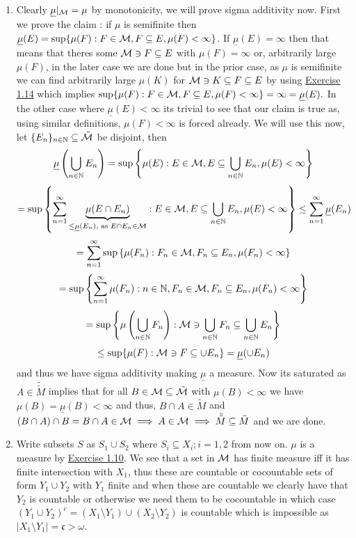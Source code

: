 \documentclass[12pt,a4paper]{article}
\begin{document}
\begin{solution}
\begin{enumerate}[label=\alph*.]
        Now if $F\subseteq A$ then as $\mu$ is complete we have $F\in\mM\subseteq\tilde{\mM}\ni F$ and thus, $\tilde{\mu}(F)=\mu(F)=0$ so $\tilde{\mu}$ is complete as well.
        \item Clearly $\underline{\mu}\vert_{\mathcal{M}}=\mu$ by monotonicity, we will prove sigma additivity now. 
        First we prove the claim : if $\mu$ is semifinite then $\underline{\mu}(E)=\sup\{\mu(F):F\in\mathcal{M},F\subseteq E,\mu(F)<\infty\}$. If $\underline{\mu}(E)=\infty$ then that means that theres some $\mathcal{M}\ni F\subseteq E$ with $\mu(F)=\infty$ or, arbitrarily large $\mu(F)$, in the later case we are done but in the prior case, as $\mu$ is semifinite we can find arbitrarily large $\mu(K)$ for $\mathcal{M}\ni K\subseteq F\subseteq E$ by using \hyperref[prob:1-14]{Exercise 1.14} which implies $\sup\{\mu(F):F\in\mathcal{M},F\subseteq E,\mu(F)<\infty\}=\infty=\underline{\mu}(E).$
        In the other case where $\underline{\mu}(E)<\infty$ its trivial to see that our claim is true as, using similar definitions, $\mu(F)<\infty$ is forced already.
        We will use this now, let $\{E_n\}_{n\in\mathbb{N}}\subseteq\tilde{\mathcal{M}}$ be disjoint, then
        $$\underline{\mu}\left(\bigcup_{n\in\mathbb{N}}E_n\right)=\sup\left\{\mu(E):E\in\mathcal{M},E\subseteq\bigcup_{n\in\mathbb{N}}E_n,\mu(E)<\infty\right\}$$
        $$=\sup\left\{\sum_{n=1}^\infty\underbrace{\mu(E\cap E_n)}_{\leq\underline{\mu}(E_n),\text{ as }E\cap E_n\in\mathcal{M}}:E\in\mathcal{M},E\subseteq\bigcup_{n\in\mathbb{N}}E_n,\mu(E)<\infty\right\}\leq\sum_{n=1}^\infty\underline{\mu}(E_n)$$
        $$=\sum_{n=1}^\infty\sup\left\{\mu(F_n):F_n\in\mathcal{M},F_n\subseteq E_n,\mu(F_n)<\infty\right\}$$
        $$=\sup\left\{\sum_{n=1}^\infty\mu(F_n):n\in\mathbb{N},F_n\in\mathcal{M},F_n\subseteq E_n,\mu(F_n)<\infty\right\}$$
        $$=\sup\left\{\mu\left(\bigcup_{n\in\mathbb{N}}F_n\right):\mathcal{M}\ni\bigcup_{n\in\mathbb{N}}F_n\subseteq\bigcup_{n\in\mathbb{N}}E_n\right\}$$
        $$\leq\sup\{\mu(F):\mathcal{M}\ni F\subseteq \cup E_n\}=\underline{\mu}(\cup E_n)$$
        and thus we have sigma additivity making $\underline{\mu}$ a measure. Now its saturated as $A\in\tilde{\tilde{M}}$ implies that for all $B\in\mathcal{M}\subseteq\tilde{\mathcal{M}}$ with $\mu(B)<\infty$ we have $\mu(B)=\underline{\mu}(B)<\infty$ and thus, $B\cap A\in\tilde{M}$ and $(B\cap A)\cap B=B\cap A\in\mathcal{M}\implies A\in\mathcal{M}\implies \tilde{\tilde{M}}\subseteq\tilde{M}$ and we are done. 
        \item Write subsets $S$ as $S_1\cup S_2$ where $S_i\subseteq X_i;i=1,2$ from now on. $\mu$ is a measure by \hyperref[prob:1-10]{Exercise 1.10}.
        We see that a set in $\mathcal{M}$ has finite measure iff it has finite intersection with $X_1$, thus these are countable or cocountable sets of form $Y_1\cup Y_2$ with $Y_1$ finite and when these are countable we clearly have that $Y_2$ is countable or otherwise we need them to be cocountable in which case $(Y_1\cup Y_2)^c=(X_1\setminus Y_1)\cup(X_2\setminus Y_2)$ is countable which is impossible as $|X_1\setminus Y_1|=\mathfrak{c}>\omega$. 

\end{enumerate}
\end{solution}
\end{document}
